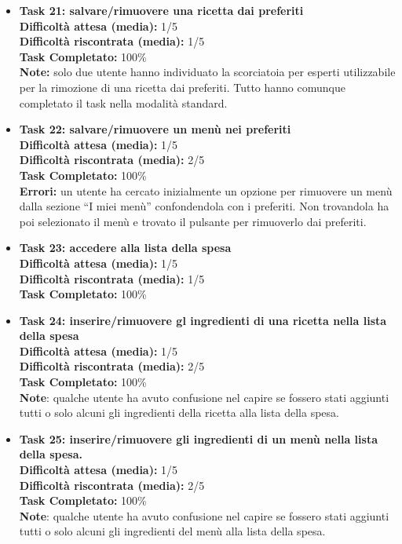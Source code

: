 \begin{itemize}
\item
\textbf{Task 21: salvare/rimuovere una ricetta dai preferiti}\\
\textbf{Difficoltà attesa (media):} 1/5\\
\textbf{Difficoltà riscontrata (media):} 1/5\\
\textbf{Task Completato:} 100\%\\
\textbf{Note:} solo due utente hanno individuato la scorciatoia per
esperti utilizzabile per la rimozione di una ricetta dai preferiti.
Tutto hanno comunque completato il task nella modalità standard.

\item
\textbf{Task 22: salvare/rimuovere un menù nei preferiti}\\
\textbf{Difficoltà attesa (media):} 1/5\\
\textbf{Difficoltà riscontrata (media):} 2/5\\
\textbf{Task Completato:} 100\%\\
\textbf{Errori:} un utente ha cercato inizialmente un opzione per
rimuovere un menù dalla sezione ``I miei menù'' confondendola con i
preferiti. Non trovandola ha
poi selezionato il menù e trovato il pulsante per rimuoverlo dai
preferiti.

\item
\textbf{Task 23: accedere alla lista della spesa}\\
\textbf{Difficoltà attesa (media):} 1/5\\
\textbf{Difficoltà riscontrata (media):} 1/5\\
\textbf{Task Completato:} 100\%\\

\item
\textbf{Task 24: inserire/rimuovere gl ingredienti di una ricetta nella
lista della spesa}\\
\textbf{Difficoltà attesa (media):} 1/5\\
\textbf{Difficoltà riscontrata (media):} 2/5\\
\textbf{Task Completato:} 100\%\\
\textbf{Note}: qualche utente ha avuto confusione nel capire se fossero
stati aggiunti tutti o solo alcuni gli ingredienti della ricetta alla
lista della spesa.

\item
\textbf{Task 25: inserire/rimuovere gli ingredienti di un menù nella
lista della spesa.}\\
\textbf{Difficoltà attesa (media):} 1/5\\
\textbf{Difficoltà riscontrata (media):} 2/5\\
\textbf{Task Completato:} 100\%\\
\textbf{Note}: qualche utente ha avuto confusione nel capire se fossero
stati aggiunti tutti o solo alcuni gli ingredienti del menù alla lista
della spesa.


\end{itemize}
